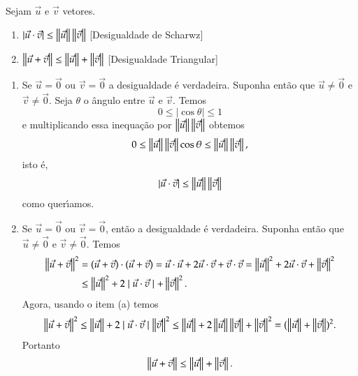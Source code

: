 \begin{proposicao}\label{DesigualdadeTriangular}
  Sejam $\vec{u}$ e $\vec{v}$ vetores.
  \begin{enumerate}
    \item $|\vec{u}\cdot\vec{v}| \le \left\Vert{\vec{u}}\right\Vert\left\Vert{\vec{v}}\right\Vert$ [Desigualdade de Scharwz]
    \item $\left\Vert{\vec{u} + \vec{v}}\right\Vert \le \left\Vert{\vec{u}}\right\Vert + \left\Vert{\vec{v}}\right\Vert$ [Desigualdade Triangular]
  \end{enumerate}
\end{proposicao}
\begin{prova}
  \begin{enumerate}
    \item Se $\vec{u} = \vec{0}$ ou $\vec{v} = \vec{0}$ a desigualdade \'e verdadeira. Suponha ent\~ao que $\vec{u} \ne \vec{0}$ e $\vec{v} \ne \vec{0}$. Seja $\theta$ o \^angulo entre $\vec{u}$ e $\vec{v}$. Temos
    \[
      0 \le |\cos\theta| \le 1
    \]
    e multiplicando essa inequa\c{c}\~ao por $\left\Vert{\vec{u}}\right\Vert\left\Vert{\vec{v}}\right\Vert$ obtemos
    \[
      0 \le \left\Vert{\vec{u}}\right\Vert\left\Vert{\vec{v}}\right\Vert\cos\theta \le \left\Vert{\vec{u}}\right\Vert\left\Vert{\vec{v}}\right\Vert,
    \]
    isto \'e,
    \[
      |\vec{u}\cdot\vec{v}| \le \left\Vert{\vec{u}}\right\Vert\left\Vert{\vec{v}}\right\Vert
    \]
    como quer{\'\i}amos.
    \item Se $\vec{u} = \vec{0}$ ou $\vec{v} = \vec{0}$, ent\~ao a desigualdade \'e verdadeira. Suponha ent\~ao que $\vec{u} \ne \vec{0}$ e $\vec{v} \ne \vec{0}$. Temos
    \begin{align*}
      \left\Vert{\vec{u} + \vec{v}}\right\Vert^2 &= (\vec{u} + \vec{v})\cdot(\vec{u} + \vec{v}) = \vec{u}\cdot\vec{u} + 2\vec{u}\cdot\vec{v} + \vec{v}\cdot\vec{v} = \left\Vert{\vec{u}}\right\Vert^2 + 2\vec{u}\cdot\vec{v} + \left\Vert{\vec{v}}\right\Vert^2 \\ &\le \left\Vert{\vec{u}}\right\Vert^2 + 2\mid\vec{u}\cdot\vec{v}\mid + \left\Vert{\vec{v}}\right\Vert^2.
    \end{align*}
    Agora, usando o item (a) temos
    \begin{align*}
      \left\Vert{\vec{u} + \vec{v}}\right\Vert^2 \le \left\Vert{\vec{u}}\right\Vert + 2\mid\vec{u}\cdot\vec{v}\mid \left\Vert{\vec{v}}\right\Vert^2 \le \left\Vert{\vec{u}}\right\Vert + 2\left\Vert{\vec{u}}\right\Vert\left\Vert{\vec{v}}\right\Vert + \left\Vert{\vec{v}}\right\Vert^2 = (\left\Vert{\vec{u}}\right\Vert + \left\Vert{\vec{v}}\right\Vert)^2.
    \end{align*}
    Portanto
    \[
      \left\Vert{\vec{u} + \vec{v}}\right\Vert \le \left\Vert{\vec{u}}\right\Vert + \left\Vert{\vec{v}}\right\Vert.
    \]
  \end{enumerate}
\end{prova}

